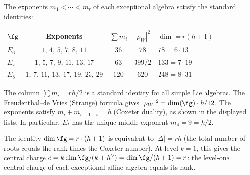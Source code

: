 \begin{remark}%
\label{rem:exceptional-exponents}
The exponents $m_1 < \cdots < m_r$ of each exceptional algebra
satisfy the standard identities:
\begin{center}
\renewcommand{\arraystretch}{1.3}
\begin{tabular}{lcccl}
\toprule
$\fg$ & Exponents & $\sum m_i$ & $|\rho_W|^2$ & $\dim = r(h+1)$ \\
\midrule
$E_6$ & $1,\, 4,\, 5,\, 7,\, 8,\, 11$ & $36$ & $78$ & $78 = 6 \cdot 13$ \\
$E_7$ & $1,\, 5,\, 7,\, 9,\, 11,\, 13,\, 17$ & $63$ & $399/2$ & $133 = 7 \cdot 19$ \\
$E_8$ & $1,\, 7,\, 11,\, 13,\, 17,\, 19,\, 23,\, 29$ & $120$ & $620$ & $248 = 8 \cdot 31$ \\
\bottomrule
\end{tabular}
\end{center}
The column $\sum m_i = rh/2$ is a standard identity
for all simple Lie algebras. The Freudenthal--de Vries
(Strange) formula gives $|\rho_W|^2 = \dim(\fg)\cdot h/12$.
The exponents satisfy
$m_i + m_{r+1-i} = h$ (Coxeter duality),
as shown in the displayed lists. In particular, $E_7$
has the unique middle exponent $m_4 = 9 = h/2$.

The identity $\dim\fg = r \cdot (h+1)$ is equivalent to
$|\Delta| = rh$ (the total number of roots equals the rank
times the Coxeter number). At level $k = 1$, this gives
the central charge $c = k\dim\fg/(k + h^\vee)
= \dim\fg/(h+1) = r$: the level-one central charge of
each exceptional affine algebra equals its rank.
\end{remark}

